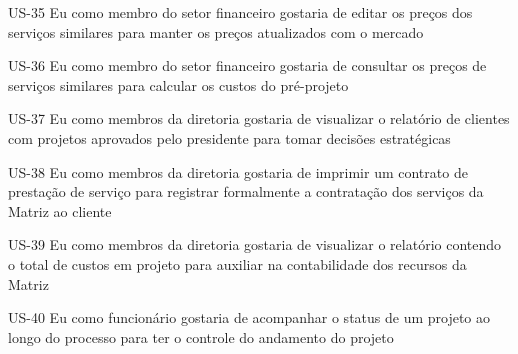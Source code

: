 US-35 Eu como membro do setor financeiro gostaria de editar os preços dos serviços similares para manter os preços atualizados com o mercado


US-36 Eu como membro do setor financeiro gostaria de consultar os preços de serviços similares para calcular os custos do pré-projeto


US-37 Eu como membros da diretoria gostaria de visualizar o relatório de clientes com projetos aprovados pelo presidente para tomar decisões estratégicas


US-38 Eu como membros da diretoria gostaria de imprimir um contrato de prestação de serviço para registrar formalmente a contratação dos serviços da Matriz ao cliente


US-39 Eu como membros da diretoria gostaria de visualizar o relatório contendo o total de custos em projeto para auxiliar na contabilidade dos recursos da Matriz


US-40 Eu como funcionário gostaria de acompanhar o status de um projeto ao longo do processo para ter o controle do andamento do projeto

